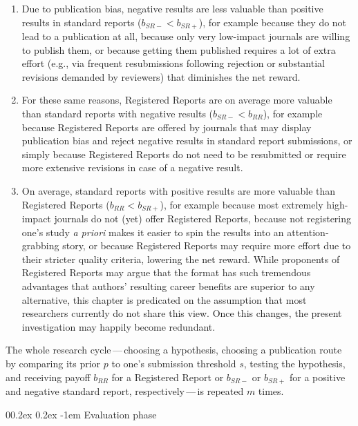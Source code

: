 \documentclass[british,,man,mask,floatsintext]{apa6}
\makeatletter
\providecommand{\tightlist}{%
  \setlength{\itemsep}{0pt}\setlength{\parskip}{0pt}}
\renewcommand{\paragraph}{\@startsection{paragraph}{4}{\parindent}%
  {0\baselineskip \@plus 0.2ex \@minus 0.2ex}%
  {-1em}%
  {\normalfont\normalsize\bfseries\itshape\typesectitle}}
\makeatother
\begin{document}
\begin{enumerate}
\def\labelenumi{\arabic{enumi}.}
\tightlist
\item
  Due to publication bias, negative results are less valuable than positive results in standard reports (\(b_{SR-} < b_{SR+}\)), for example because they do not lead to a publication at all, because only very low-impact journals are willing to publish them, or because getting them published requires a lot of extra effort (e.g., via frequent resubmissions following rejection or substantial revisions demanded by reviewers) that diminishes the net reward.
\item
  For these same reasons, Registered Reports are on average more valuable than standard reports with negative results (\(b_{SR-} < b_{RR}\)), for example because Registered Reports are offered by journals that may display publication bias and reject negative results in standard report submissions, or simply because Registered Reports do not need to be resubmitted or require more extensive revisions in case of a negative result.
\item
  On average, standard reports with positive results are more valuable than Registered Reports (\(b_{RR} < b_{SR+}\)), for example because most extremely high-impact journals do not (yet) offer Registered Reports, because not registering one's study \emph{a priori} makes it easier to spin the results into an attention-grabbing story, or because Registered Reports may require more effort due to their stricter quality criteria, lowering the net reward.
  While proponents of Registered Reports may argue that the format has such tremendous advantages that authors' resulting career benefits are superior to any alternative, this chapter is predicated on the assumption that most researchers currently do not share this view.
  Once this changes, the present investigation may happily become redundant.
\end{enumerate}

The whole research cycle\(\,\)---\(\,\)choosing a hypothesis, choosing a publication route by comparing its prior \(p\) to one's submission threshold \(s\), testing the hypothesis, and receiving payoff \(b_{RR}\) for a Registered Report or \(b_{SR-}\) or \(b_{SR+}\) for a positive and negative standard report, respectively\(\,\)---\(\,\)is repeated \(m\) times.

\hypertarget{evaluation-phase}{%
\paragraph{Evaluation phase}\label{evaluation-phase}}
\end{document}
